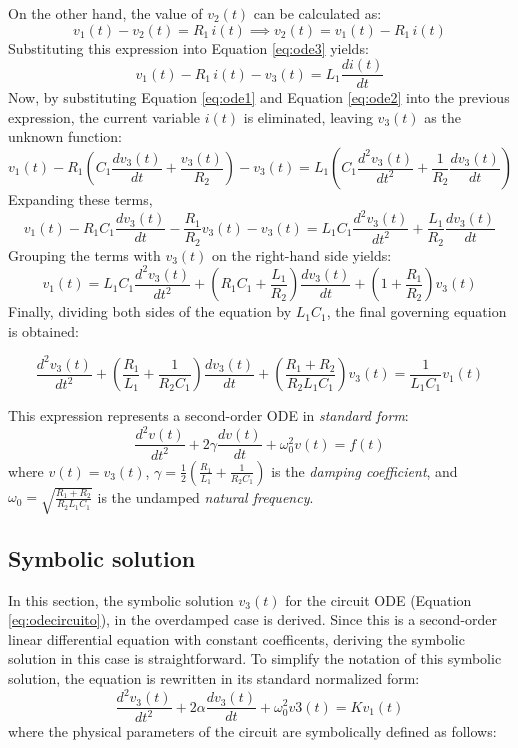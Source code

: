 \documentclass[energies,accept,oneauthor,pdftex]{Definitions/mdpi}
\begin{document}
On the other hand, the value of $v_2(t)$ can be calculated as:
$$v_1(t) - v_2(t) = R_1 \,  i(t) \implies v_2(t) = v_1(t) - R_1 \,  i(t)$$
Substituting this expression into Equation \ref{eq:ode3} yields:
$$v_1(t) - R_1 \,  i(t) - v_3(t) = L_1 \frac{di(t)}{dt}$$
Now, by substituting Equation \ref{eq:ode1} and Equation \ref{eq:ode2} into the previous expression, the current variable $i(t)$ is eliminated, leaving $v_3(t)$ as the unknown function:
$$v_1(t) - R_1 \left( C_1 \frac{dv_3(t)} {dt} + \frac{v_3(t)}{R_2} \right) - v_3(t) = L_1 \left( C_1 \frac{d^2v_3(t)}{dt^2} + \frac{1}{R_2} \frac{dv_3(t)}{dt} \right)$$
Expanding these terms,
$$v_1(t) - R_1C_1 \frac{dv_3(t)} {dt} - \frac{R_1}{R_2}v_3(t) - v_3(t) = L_1C_1 \frac{d^2v_3(t)}{dt^2} + \frac{L_1}{R_2} \frac{dv_3(t)}{dt}$$
Grouping the terms with $v_3(t)$ on the right-hand side yields:
$$v_1(t) = L_1C_1 \frac{d^2v_3(t)}{dt^2} + \left( R_1C_1 + \frac{L_1}{R_2} \right) \frac{dv_3(t)} {dt} + \left( 1 + \frac{R_1}{R_2} \right) v_3(t)$$
Finally, dividing both sides of the equation by $L_1C_1$, the final governing equation is obtained:

\begin{equation}
	\frac{d^2v_3(t)}{dt^2} + \left( \frac{R_1}{L_1} + \frac{1}{R_2C_1} \right) \frac{dv_3(t)}{dt} + \left( \frac{R_1 + R_2}{R_2L_1C_1} \right) v_3(t) = \frac{1}{L_1C_1} v_1(t)
	\label{eq:odecircuito}
\end{equation}

This expression represents a second-order ODE in \textit{standard form}:
$$\frac{d^2v(t)}{dt^2} + 2\gamma \frac{dv(t)}{dt} + \omega_0^2 v(t) = f(t)$$
where $v(t)=v_3(t)$, $\gamma = \frac{1}{2} \left( \frac{R_1}{L_1} + \frac {1}{R_2C_1} \right)$ is the \textit{damping coefficient}, and $\omega_0 = \sqrt{\frac{R_1 + R_2}{R_2L_1C_1}}$ is the undamped \textit{natural frequency}.



\subsection{Symbolic solution}

In this section, the symbolic solution $v_3(t)$ for the circuit ODE (Equation \ref{eq:odecircuito}), in the overdamped case is derived. Since this is a second-order linear differential equation with constant  coefficents, deriving the symbolic solution in this case is straightforward. To simplify the notation
of this symbolic solution, the equation is rewritten in its standard normalized form:
\[
\frac{d^2 v_3 (t)}{d t^2} + 2\alpha \frac{d v_3 (t)}{d t}+ \omega_0^2 v3 (t) = K v_1 (t)
\]
where the physical parameters of the circuit are symbolically defined as follows:
\end{document}

